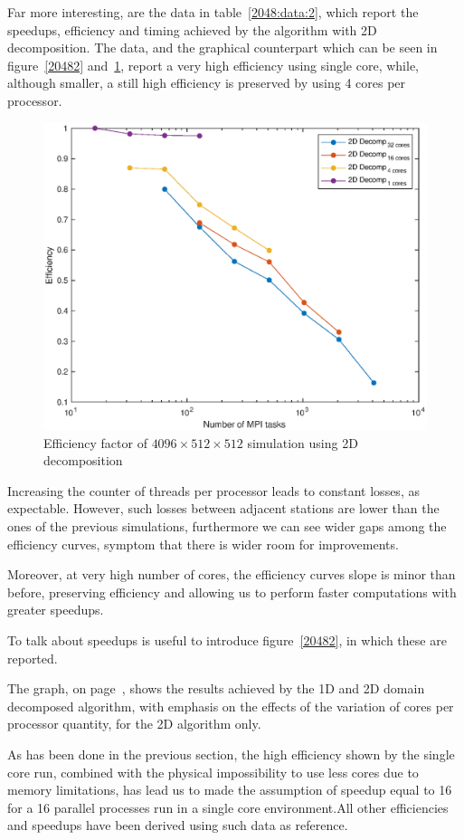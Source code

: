 Far more interesting, are the data in table~\ref{2048:data:2}, which report the speedups, efficiency and timing achieved by the algorithm with 2D decomposition. The data, and the graphical counterpart which can be seen in figure~\ref{20482} and~\ref{20484}, report a very high efficiency using single core, while, although smaller, a still high efficiency is preserved by using 4 cores per processor.\\
\par
\begin{figure}
\begin{center}
\includegraphics[scale=0.55]{grafici/20484}
\caption{Efficiency factor of $4096\times512 \times512$ simulation using 2D decomposition}
\label{20484}
\end{center}
\end{figure}
Increasing the counter of threads per processor leads to constant losses, as expectable. However, such losses between adjacent stations are lower than the ones of the previous simulations, furthermore we can see wider gaps among the efficiency curves, symptom that there is wider room for improvements.\par
Moreover, at very high number of cores, the efficiency curves slope is minor than before, preserving efficiency and allowing us to perform faster computations with greater speedups.\\
\par
To talk about speedups is useful to introduce figure~\ref{20482}, in which these are reported.\par
The graph, on page~\pageref{20482}, shows the results achieved by the 1D and 2D domain decomposed algorithm, with emphasis on the effects of the variation of cores per processor quantity, for the 2D algorithm only.\par
As has been done in the previous section, the high efficiency shown by the single core run, combined with the physical impossibility to use less cores due to memory limitations, has lead us to made the assumption of speedup equal to 16 for a 16 parallel processes run in a single core environment.All other efficiencies and speedups have been derived using such data as reference.\\
\par

